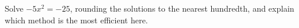 Solve $-5x^2=-25$, rounding the solutions to the nearest hundredth, and explain which method is the most efficient here.
